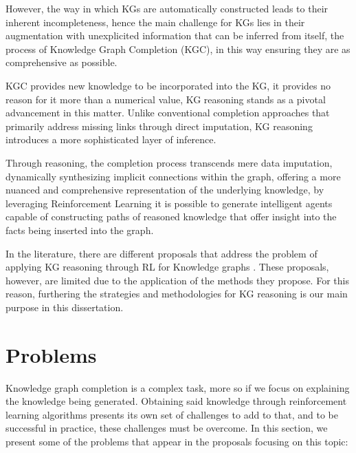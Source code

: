 However, the way in which KGs are automatically constructed leads to their inherent incompleteness, hence the main challenge for KGs lies in their augmentation with unexplicited information that can be inferred from itself, the process of Knowledge Graph Completion (KGC), in this way ensuring they are as comprehensive as possible.

KGC provides new knowledge to be incorporated into the KG, it provides no reason for it more than a numerical value, KG reasoning stands as a pivotal advancement in this matter. Unlike conventional completion approaches that primarily address missing links through direct imputation, KG reasoning introduces a more sophisticated layer of inference.

Through reasoning, the completion process transcends mere data imputation, dynamically synthesizing implicit connections within the graph, offering a more nuanced and comprehensive representation of the underlying knowledge, by leveraging Reinforcement Learning it is possible to generate intelligent agents capable of constructing paths of reasoned knowledge that offer insight into the facts being inserted into the graph.

In the literature, there are different proposals that address the problem of applying KG reasoning through RL for Knowledge graphs \cite{lao2011random, das2017go, xiong2017deeppath, lin2018multi, xian2019reinforcement, tiwari2021dapath, cui2023incorporating}. These proposals, however, are limited due to the application of the methods they propose. For this reason, furthering the strategies and methodologies for KG reasoning is our main purpose in this dissertation.

\section{Problems}\label{sec:moti-problems}
Knowledge graph completion is a complex task, more so if we focus on explaining the knowledge being generated. Obtaining said knowledge through reinforcement learning algorithms presents its own set of challenges to add to that, and to be successful in practice, these challenges must be overcome. In this section, we present some of the problems that appear in the proposals focusing on this topic:

